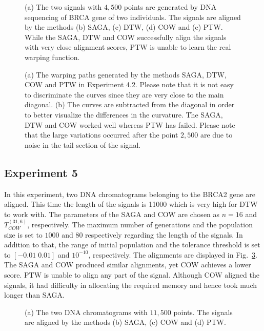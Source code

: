 \documentclass[number,1p,12pt]{elsarticle}
\begin{document}
\begin{figure}
\caption{(a) The two signals with $4,500$ points are generated by DNA sequencing of BRCA gene of two individuals. The signals are aligned by the methods (b) SAGA, (c) DTW, (d) COW and (e) PTW. While the SAGA, DTW and COW successfully align the signals with very close alignment scores, PTW is unable to learn the real warping function. }
\label{Figure12}
\end{figure} 

\begin{figure}
\caption{(a) The warping paths generated by the methods SAGA, DTW, COW and PTW in Experiment 4.2. Please note that it is not easy to discriminate the curves since they are very close to the main diagonal.  (b) The curves are subtracted from the diagonal in order to better visualize the differences in the curvature.  The SAGA, DTW and COW worked well whereas PTW has failed.  Please note that the large variations occurred after the point $2,500$ are due to noise in the tail section of the signal.}
\label{Figure13}
\end{figure} 

\subsection{Experiment 5}
In this experiment, two DNA chromatograms belonging to the BRCA2 gene are aligned. This time the length of the signals is 11000 which is very high for DTW to work with. The parameters of the SAGA and COW are chosen as $n=16$ and  $T_{COW}^{(31,6)}$, respectively. The maximum number of generations and the population size is set to $1000$ and $80$ respectively regarding the length of the signals. In addition to that, the range of initial population and the tolerance threshold is set to $[-0.01\;0.01]$ and $10^{-10}$, respectively. The alignments are displayed in Fig.~\ref{Figure14}. The SAGA and COW produced similar alignments, yet COW achieves a lower score. PTW is unable to align any part of the signal. Although COW aligned the signals, it had difficulty in allocating the required memory and hence took much longer than SAGA. 

\begin{figure}
\caption{(a) The two DNA chromatograms with $11,500$ points. The signals are aligned by the methods (b) SAGA, (c) COW and (d) PTW. }
\label{Figure14}
\end{figure} 
\end{document}
